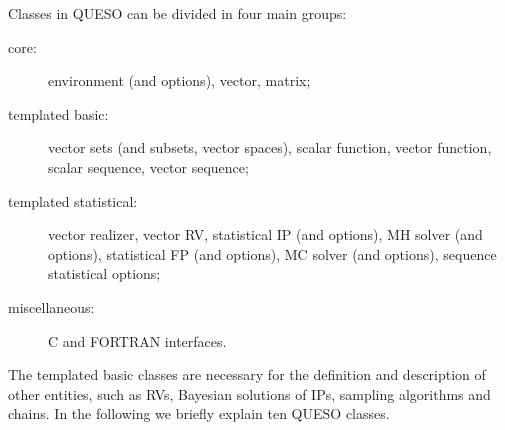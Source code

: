 Classes in QUESO can be divided in four main groups:
\begin{description}
 \item[ core:] environment (and options), vector, matrix;
\item[ templated basic:] vector sets (and subsets, vector spaces),  scalar function, vector function, scalar sequence, vector sequence;
\item[ templated statistical:] vector realizer, vector RV, statistical IP (and options), MH solver (and options), statistical FP (and options), MC solver (and options), sequence statistical options;
\item[ miscellaneous:] C and FORTRAN interfaces.
\end{description}


The templated basic classes are necessary for the definition and description of other entities, such as RVs, Bayesian solutions of IPs, sampling algorithms and chains.
%
In the following we briefly explain ten QUESO classes.

